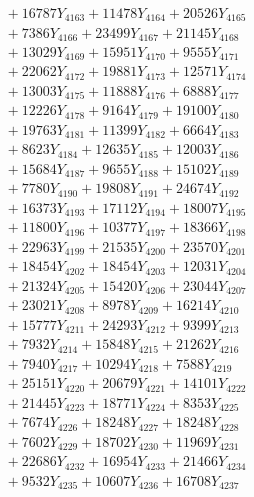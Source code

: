 \documentclass[a4paper,10pt]{article}
\begin{document}
{\begin{align}
&\;  + 16787 Y_{4163} + 11478 Y_{4164} + 20526 Y_{4165} \\[0.3ex]
&\;  + 7386 Y_{4166} + 23499 Y_{4167} + 21145 Y_{4168} \\[0.5ex]\allowbreak
&\;  + 13029 Y_{4169} + 15951 Y_{4170} + 9555 Y_{4171} \\[0.3ex]
&\;  + 22062 Y_{4172} + 19881 Y_{4173} + 12571 Y_{4174} \\[0.3ex]
&\;  + 13003 Y_{4175} + 11888 Y_{4176} + 6888 Y_{4177} \\[0.3ex]
&\;  + 12226 Y_{4178} + 9164 Y_{4179} + 19100 Y_{4180} \\[0.3ex]
&\;  + 19763 Y_{4181} + 11399 Y_{4182} + 6664 Y_{4183} \\[0.3ex]
&\;  + 8623 Y_{4184} + 12635 Y_{4185} + 12003 Y_{4186} \\[0.3ex]
&\;  + 15684 Y_{4187} + 9655 Y_{4188} + 15102 Y_{4189} \\[0.3ex]
&\;  + 7780 Y_{4190} + 19808 Y_{4191} + 24674 Y_{4192} \\[0.3ex]
&\;  + 16373 Y_{4193} + 17112 Y_{4194} + 18007 Y_{4195} \\[0.3ex]
&\;  + 11800 Y_{4196} + 10377 Y_{4197} + 18366 Y_{4198} \\[0.5ex]\allowbreak
&\;  + 22963 Y_{4199} + 21535 Y_{4200} + 23570 Y_{4201} \\[0.3ex]
&\;  + 18454 Y_{4202} + 18454 Y_{4203} + 12031 Y_{4204} \\[0.3ex]
&\;  + 21324 Y_{4205} + 15420 Y_{4206} + 23044 Y_{4207} \\[0.3ex]
&\;  + 23021 Y_{4208} + 8978 Y_{4209} + 16214 Y_{4210} \\[0.3ex]
&\;  + 15777 Y_{4211} + 24293 Y_{4212} + 9399 Y_{4213} \\[0.3ex]
&\;  + 7932 Y_{4214} + 15848 Y_{4215} + 21262 Y_{4216} \\[0.3ex]
&\;  + 7940 Y_{4217} + 10294 Y_{4218} + 7588 Y_{4219} \\[0.3ex]
&\;  + 25151 Y_{4220} + 20679 Y_{4221} + 14101 Y_{4222} \\[0.3ex]
&\;  + 21445 Y_{4223} + 18771 Y_{4224} + 8353 Y_{4225} \\[0.3ex]
&\;  + 7674 Y_{4226} + 18248 Y_{4227} + 18248 Y_{4228} \\[0.5ex]\allowbreak
&\;  + 7602 Y_{4229} + 18702 Y_{4230} + 11969 Y_{4231} \\[0.3ex]
&\;  + 22686 Y_{4232} + 16954 Y_{4233} + 21466 Y_{4234} \\[0.3ex]
&\;  + 9532 Y_{4235} + 10607 Y_{4236} + 16708 Y_{4237} \\[0.3ex]

\end{align}}
\end{document}
